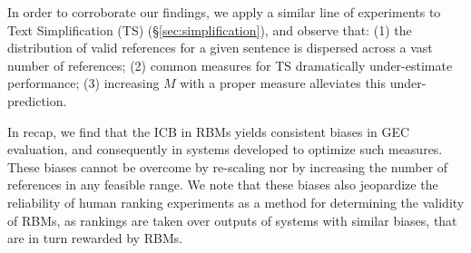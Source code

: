 \documentclass[a4paper, 11pt]{article}
\newcommand{\lc}[1]{\footnote{\color{blue}LC: #1}}
\begin{document}
  In order to corroborate our findings, we apply a 
  similar line of experiments to Text Simplification (TS) (\S\ref{sec:simplification}),
  and observe that: (1) the distribution of valid references for a given sentence is dispersed across a vast number of references; 
  (2) common measures for TS dramatically under-estimate performance; 
  (3) increasing $M$ with a proper measure alleviates this under-prediction.

  In recap, we find that the ICB in RBMs yields consistent biases in GEC evaluation, and consequently
  in systems developed to optimize such measures. 
  These biases cannot be overcome by re-scaling nor by increasing the number of references in any feasible range. 
  We note that these biases also jeopardize the reliability of human ranking experiments as a method for determining 
  the validity of RBMs, as rankings are taken over outputs of systems with similar biases, that are in turn rewarded by RBMs.
  
  
  
	
	

\end{document}
